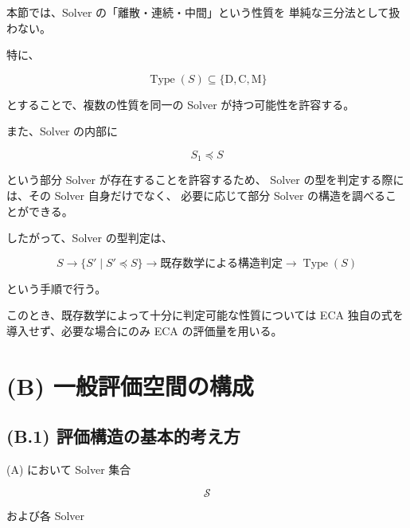 \documentclass[a4paper,11pt]{article}
\newcommand{\Solver}{\mathcal{S}}
\newcommand{\SubSolver}{\preceq}
\newcommand{\Type}{\operatorname{Type}}
\newcommand{\DType}{\mathrm{D}}
\newcommand{\CType}{\mathrm{C}}
\newcommand{\MType}{\mathrm{M}}
\begin{document}
本節では、Solver の「離散・連続・中間」という性質を
単純な三分法として扱わない。

特に、

\begin{equation}
    \Type(S)
    \subseteq
    \{\DType,\CType,\MType\}
\end{equation}

とすることで、複数の性質を同一の Solver が持つ可能性を許容する。

また、Solver の内部に

\begin{equation}
    S_1\SubSolver S
\end{equation}

という部分 Solver が存在することを許容するため、
Solver の型を判定する際には、その Solver 自身だけでなく、
必要に応じて部分 Solver の構造を調べることができる。

したがって、Solver の型判定は、

\begin{equation}
    \boxed{
    S
    \longrightarrow
    \{S'\mid S'\SubSolver S\}
    \longrightarrow
    \text{既存数学による構造判定}
    \longrightarrow
    \Type(S)
    }
    \label{eq:A-type-determination}
\end{equation}

という手順で行う。

このとき、既存数学によって十分に判定可能な性質については
ECA 独自の式を導入せず、必要な場合にのみ ECA の評価量を用いる。


\section{(B) 一般評価空間の構成}
\label{sec:B}

\subsection{(B.1) 評価構造の基本的考え方}
\label{subsec:B1}

(A) において Solver 集合

\begin{equation}
    \Solver
\end{equation}

および各 Solver
\end{document}
